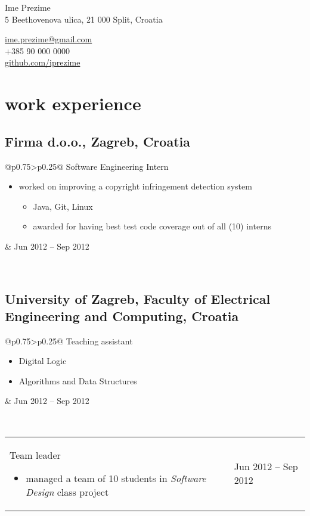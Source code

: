 \documentclass[a4paper]{article}
\makeatletter
\newlength{\tablewidth}
\newenvironment{period}[2]{%
\newcommand{\sarma}{#2}%
\setlength{\tablewidth}{\linewidth}
\addtolength{\tablewidth}{-2\tabcolsep}
\begin{tabular}{@{}p{0.75\tablewidth}>{\raggedleft\arraybackslash}p{0.25\tablewidth}@{}}%
#1 \newline
\begin{itemize}
}{%
\end{itemize} & \sarma \\%
\end{tabular}\\
}
\makeatother
\begin{document}
\fontfamily{\sfdefault}
\selectfont

\begin{minipage}{.5\textwidth}
\LARGE{Ime Prezime}\\
\normalsize{5 Beethovenova ulica, 21 000 Split, Croatia}
\end{minipage}%
\begin{minipage}{.5\textwidth}
\raggedleft
\href{mailto:ime.prezime@gmail.com}{ime.prezime@gmail.com} \\
+385 90 000 0000 \\
\href{https://github.com/iprezime}{github.com/iprezime}
\end{minipage}

\vspace{1em}

\section{work experience}
\subsection{Firma d.o.o., Zagreb, Croatia}
\begin{period}{Software Engineering Intern}{Jun 2012 -- Sep 2012}
    \item 
        worked on improving a copyright infringement detection system
        \begin{itemize}
            \item Java, Git, Linux
            \item awarded for having best test code coverage out of all (10) interns
        \end{itemize}
\end{period}
\subsection{University of Zagreb, Faculty of Electrical Engineering and Computing, Croatia}
\begin{period}{Teaching assistant}{Oct 2008 -- May 2009}
    \item Digital Logic
    \item Algorithms and Data Structures
\end{period}
\begin{period}{Team leader}{Sep 2011 -- Jan 2012}
    \item managed a team of 10 students in \textit{Software Design} class project
\end{period}
\end{document}
